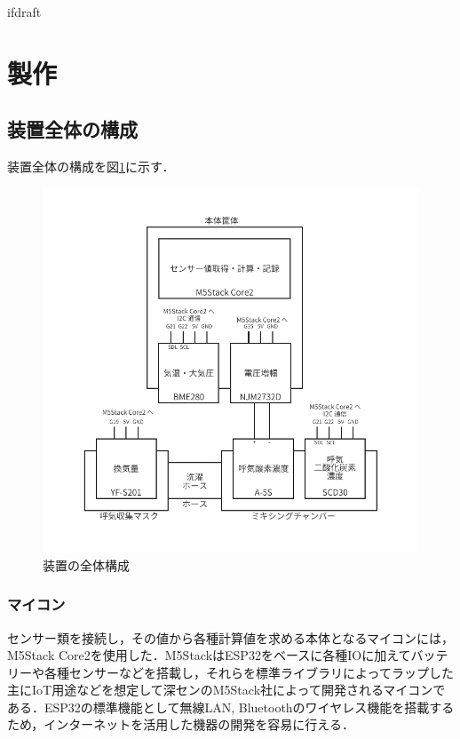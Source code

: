 \expandafter\ifx\csname ifdraft\endcsname\relax
 
\fi

\section{製作}

\subsection{装置全体の構成}

装置全体の構成を図\ref{fig:connection_map}に示す．

\begin{figure}[H]
  \begin{center}
    \includegraphics[width=12cm]{fig/connection_map}
    \caption{装置の全体構成}
    \label{fig:connection_map}
  \end{center}
\end{figure}

\subsubsection{マイコン}

センサー類を接続し，その値から各種計算値を求める本体となるマイコンには，M5Stack Core2を使用した．M5StackはESP32をベースに各種IOに加えてバッテリーや各種センサーなどを搭載し，それらを標準ライブラリによってラップした主にIoT用途などを想定して深センのM5Stack社によって開発されるマイコンである．ESP32の標準機能として無線LAN, Bluetoothのワイヤレス機能を搭載するため，インターネットを活用した機器の開発を容易に行える．


